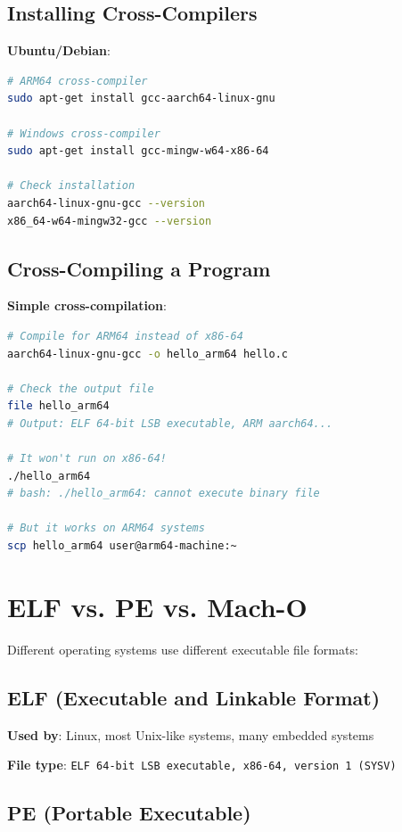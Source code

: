 \subsection{Installing Cross-Compilers}

\textbf{Ubuntu/Debian}:
\begin{lstlisting}[language=bash]
# ARM64 cross-compiler
sudo apt-get install gcc-aarch64-linux-gnu

# Windows cross-compiler
sudo apt-get install gcc-mingw-w64-x86-64

# Check installation
aarch64-linux-gnu-gcc --version
x86_64-w64-mingw32-gcc --version
\end{lstlisting}

\subsection{Cross-Compiling a Program}

\textbf{Simple cross-compilation}:
\begin{lstlisting}[language=bash]
# Compile for ARM64 instead of x86-64
aarch64-linux-gnu-gcc -o hello_arm64 hello.c

# Check the output file
file hello_arm64
# Output: ELF 64-bit LSB executable, ARM aarch64...

# It won't run on x86-64!
./hello_arm64
# bash: ./hello_arm64: cannot execute binary file

# But it works on ARM64 systems
scp hello_arm64 user@arm64-machine:~
\end{lstlisting}

\section{ELF vs. PE vs. Mach-O}

Different operating systems use different executable file formats:

\subsection{ELF (Executable and Linkable Format)}

\textbf{Used by}: Linux, most Unix-like systems, many embedded systems

\textbf{File type}: \texttt{ELF 64-bit LSB executable, x86-64, version 1 (SYSV)}

\subsection{PE (Portable Executable)}

